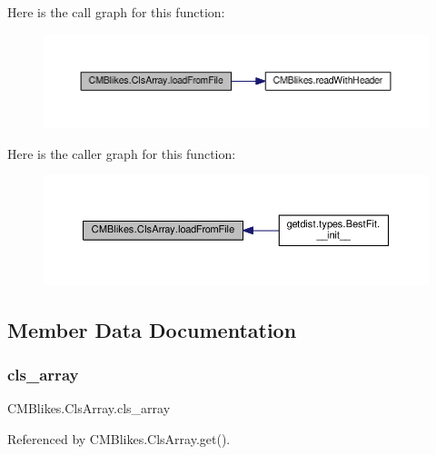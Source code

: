 Here is the call graph for this function\+:
\nopagebreak
\begin{figure}[H]
\begin{center}
\leavevmode
\includegraphics[width=350pt]{classCMBlikes_1_1ClsArray_a8d5595682cfd2e5f4db3d726d50f4505_cgraph}
\end{center}
\end{figure}
Here is the caller graph for this function\+:
\nopagebreak
\begin{figure}[H]
\begin{center}
\leavevmode
\includegraphics[width=350pt]{classCMBlikes_1_1ClsArray_a8d5595682cfd2e5f4db3d726d50f4505_icgraph}
\end{center}
\end{figure}


\subsection{Member Data Documentation}
\mbox{\label{classCMBlikes_1_1ClsArray_a7f768dded682311b93b1e6d1e2b4da3c}} 
\subsubsection{\texorpdfstring{cls\+\_\+array}{cls\_array}}
{\footnotesize\ttfamily C\+M\+Blikes.\+Cls\+Array.\+cls\+\_\+array}



Referenced by C\+M\+Blikes.\+Cls\+Array.\+get().

\mbox{\label{classCMBlikes_1_1ClsArray_af8bcb5683fef2fd567b8d0c280d5f77d}} 
